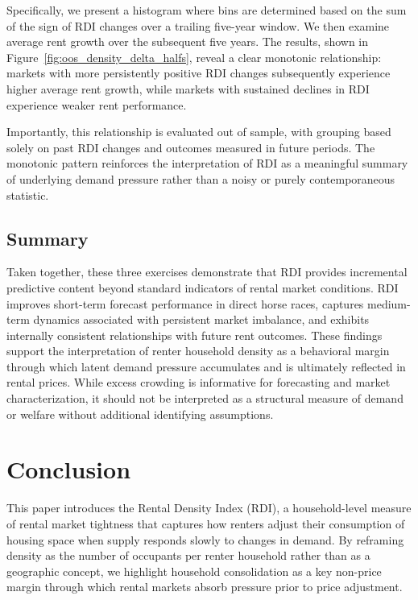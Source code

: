 \documentclass[pdflatex,sn-basic]{sn-jnl}%
\theoremstyle{thmstyleone}%
\theoremstyle{thmstyletwo}%
\theoremstyle{thmstylethree}%
\begin{document}
Specifically, we present a histogram where bins are determined based on the sum of the sign of RDI changes over a trailing five-year window. We then examine average rent growth over the subsequent five years. The results, shown in Figure~\ref{fig:oos_density_delta_halfs}, reveal a clear monotonic relationship: markets with more persistently positive RDI changes subsequently experience higher average rent growth, while markets with sustained declines in RDI experience weaker rent performance.

Importantly, this relationship is evaluated out of sample, with grouping based solely on past RDI changes and outcomes measured in future periods. The monotonic pattern reinforces the interpretation of RDI as a meaningful summary of underlying demand pressure rather than a noisy or purely contemporaneous statistic.

\subsection{Summary}
Taken together, these three exercises demonstrate that RDI provides incremental predictive content beyond standard indicators of rental market conditions. RDI improves short-term forecast performance in direct horse races, captures medium-term dynamics associated with persistent market imbalance, and exhibits internally consistent relationships with future rent outcomes. These findings support the interpretation of renter household density as a behavioral margin through which latent demand pressure accumulates and is ultimately reflected in rental prices.
While excess crowding is informative for forecasting and market characterization, it should not be interpreted as a structural measure of demand or welfare without additional identifying assumptions.

\section{Conclusion}\label{section6}

This paper introduces the Rental Density Index (RDI), a household-level measure of
rental market tightness that captures how renters adjust their consumption of housing
space when supply responds slowly to changes in demand. By reframing density as the
number of occupants per renter household rather than as a geographic concept, we
highlight household consolidation as a key non-price margin through which rental
markets absorb pressure prior to price adjustment.
\end{document}
